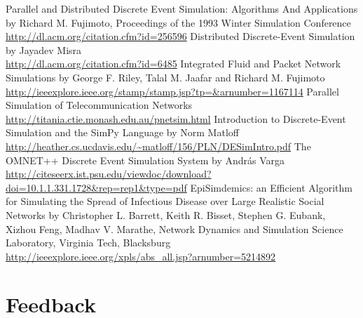 \documentclass[12pt,a4paper]{article}
\begin{document}
\begin{thebibliography}{99}
Parallel and Distributed Discrete Event Simulation: Algorithms And Applications by Richard M. Fujimoto, Proceedings of the 1993 Winter Simulation Conference
\\ \url{http://dl.acm.org/citation.cfm?id=256596}
Distributed Discrete-Event Simulation by Jayadev Misra
\\ \url{http://dl.acm.org/citation.cfm?id=6485}
Integrated Fluid and Packet Network Simulations by George F. Riley, Talal M. Jaafar and Richard M. Fujimoto
\\ \url{http://ieeexplore.ieee.org/stamp/stamp.jsp?tp=&arnumber=1167114}
Parallel Simulation of Telecommunication Networks \url{http://titania.ctie.monash.edu.au/pnetsim.html}
Introduction to Discrete-Event Simulation and the SimPy Language by Norm Matloff
\\ \url{http://heather.cs.ucdavis.edu/~matloff/156/PLN/DESimIntro.pdf}
The OMNET++ Discrete Event Simulation System by András Varga
\\ \url{http://citeseerx.ist.psu.edu/viewdoc/download?doi=10.1.1.331.1728&rep=rep1&type=pdf}
EpiSimdemics: an Efficient Algorithm for Simulating the Spread of Infectious Disease over Large Realistic Social Networks by Christopher L. Barrett, Keith R. Bisset, Stephen G. Eubank, Xizhou Feng, Madhav V. Marathe, Network Dynamics and Simulation Science Laboratory, Virginia Tech, Blacksburg
\\ \url{http://ieeexplore.ieee.org/xpls/abs_all.jsp?arnumber=5214892}
\end{thebibliography}

\section{Feedback}
\end{document}
